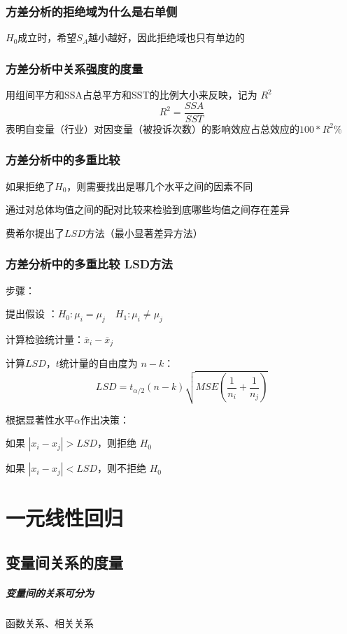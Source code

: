 \documentclass[UTF8,10pt]{book}
\begin{document}
{\subsection{方差分析的拒绝域为什么是右单侧}
	$H_0$成立时，希望$S_A$越小越好，因此拒绝域也只有单边的
\subsection{方差分析中关系强度的度量}	
用组间平方和SSA占总平方和SST的比例大小来反映，记为
$R^2$ 
$$ R^2 = \frac{SSA}{SST} $$ 
表明自变量（行业）对因变量（被投诉次数）的影响效应占总效应的$100*R^2\%$
\subsection{方差分析中的多重比较}	
如果拒绝了$H_0$，则需要找出是哪几个水平之间的因素不同 

通过对总体均值之间的配对比较来检验到底哪些均值之间存在差异 

费希尔提出了$ LSD $方法（最小显著差异方法）

\subsection{方差分析中的多重比较 LSD方法}	
步骤： 

提出假设 ：$ H_0:\mu_i = \mu_j \quad H_1:\mu_i \neq \mu_j $

计算检验统计量：$\overline{x}_i-\overline{x}_j$

计算$LSD$，$t$统计量的自由度为
$n-k$： 
$$ LSD = t_{\alpha / 2}(n-k) \sqrt{MSE \left( \frac{1}{n_i}+\frac{1}{n_j}\right)} $$ 

根据显著性水平$\alpha$作出决策：

如果 $ |x_i - x_j| > LSD$，则拒绝 $ H_0$

如果 $ |x_i - x_j| < LSD$，则不拒绝 $ H_0$



\clearpage

\chapter{一元线性回归}


\section{变量间关系的度量}

\paragraph{变量间的关系可分为}	函数关系、相关关系

}
\end{document}
